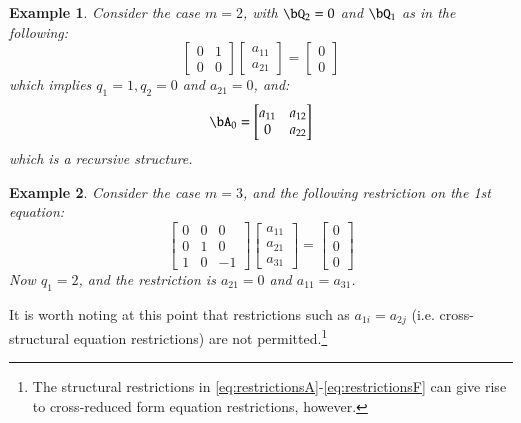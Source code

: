 \documentclass [12pt]{article}
\newtheorem{example}{Example}
\begin{document}
    \begin{example}{}
    Consider the case $m = 2$, with $\bQ_2 = 0$ and $\bQ_1$ as in the following:
    \begin{equation*}
        \begin{bmatrix}
          0 & 1 \\
          0 & 0
        \end{bmatrix}
        \begin{bmatrix}
          a_{11} \\
          a_{21}
        \end{bmatrix}
        =
        \begin{bmatrix}
          0 \\
          0
        \end{bmatrix}
    \end{equation*}
    which implies $q_1 = 1, q_2 = 0$ and $a_{21} = 0$, and:
    \begin{equation*}
        \bA_0 = \begin{bmatrix}
                  a_{11} & a_{12} \\
                  0 & a_{22}
                \end{bmatrix}
    \end{equation*}
    which is a recursive structure.
    \end{example}

    \begin{example}{}
        Consider the case $m = 3$, and the following restriction on the 1st equation:
    \begin{equation*}
        \begin{bmatrix}
          0 & 0 & 0 \\
          0 & 1 & 0 \\
          1 & 0 & -1
        \end{bmatrix}
        \begin{bmatrix}
          a_{11} \\
          a_{21} \\
          a_{31}
        \end{bmatrix}
        =
        \begin{bmatrix}
          0 \\
          0 \\
          0
        \end{bmatrix}
    \end{equation*}
    Now $q_1 = 2$, and the restriction is $a_{21}=0$ and $a_{11} = a_{31}$. 
    \end{example} \noindent
    It is worth noting at this point that restrictions such as $a_{1i} = a_{2j}$ (i.e. cross-structural equation restrictions) are not permitted.\footnote{The structural restrictions in \eqref{eq:restrictionsA}-\eqref{eq:restrictionsF} can give rise to cross-reduced form equation restrictions, however.}
    
\end{document}
